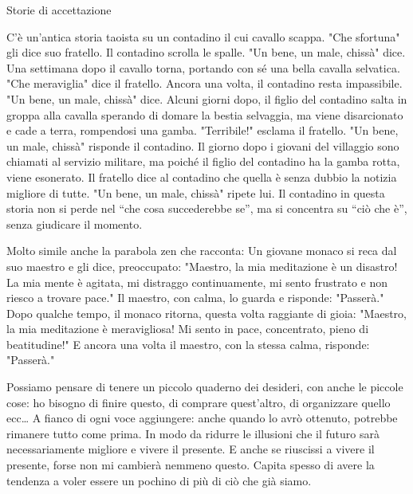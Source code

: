 \documentclass[12pt]{book} %
\begin{document}
\begin{mdframed}[linewidth=1pt]
Storie di accettazione

C'è un'antica storia taoista su un contadino il cui cavallo scappa.
"Che sfortuna" gli dice suo fratello. Il contadino scrolla le spalle.
"Un bene, un male, chissà" dice. Una settimana dopo il cavallo torna,
portando con sé una bella cavalla selvatica. "Che meraviglia" dice il
fratello. Ancora una volta, il contadino resta impassibile. "Un bene, un male,
chissà" dice. Alcuni giorni dopo, il figlio del contadino salta in groppa alla cavalla sperando di
domare la bestia selvaggia, ma viene disarcionato e cade a terra, rompendosi una gamba.
"Terribile!" esclama il fratello. "Un bene, un male,
chissà" risponde il contadino. Il giorno dopo i giovani del villaggio sono chiamati al servizio
militare, ma poiché il figlio del contadino ha la gamba rotta, viene esonerato. Il fratello dice al contadino che
quella è senza dubbio la notizia migliore di tutte. "Un bene, un male,
chissà" ripete lui. Il contadino in questa storia non si perde nel “che cosa succederebbe se”, ma
si concentra su “ciò che è”, senza giudicare il momento.

Molto simile anche la parabola zen che racconta:\newline
Un giovane monaco si reca dal suo maestro e gli dice, preoccupato:\newline
"Maestro, la mia meditazione è un disastro! La mia mente è agitata, mi distraggo continuamente, mi sento frustrato e non riesco a trovare pace."\newline
Il maestro, con calma, lo guarda e risponde:\newline
"Passerà."\newline
Dopo qualche tempo, il monaco ritorna, questa volta raggiante di gioia:\newline
"Maestro, la mia meditazione è meravigliosa! Mi sento in pace, concentrato, pieno di beatitudine!"\newline
E ancora una volta il maestro, con la stessa calma, risponde:\newline
"Passerà."

Possiamo pensare di tenere un piccolo quaderno dei desideri, con anche le piccole cose:
ho bisogno di finire questo, di comprare quest'altro, di organizzare quello ecc…
A fianco di ogni voce aggiungere: anche quando lo avrò ottenuto, potrebbe rimanere tutto come prima.
In modo da ridurre le illusioni che il futuro sarà necessariamente migliore e vivere il presente.
E anche se riuscissi a vivere il presente, forse non mi cambierà nemmeno questo.
Capita spesso di avere la tendenza a voler essere un pochino di più di ciò che già siamo.


\end{mdframed}
\end{document}
